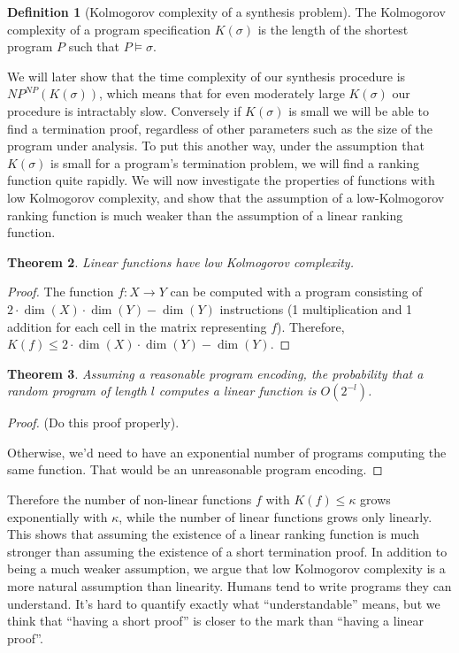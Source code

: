 \documentclass[preprint]{sigplanconf}
\newtheorem{theorem}{Theorem}
\theoremstyle{definition}
\newtheorem{definition}[theorem]{Definition}
\begin{document}
\begin{definition}[Kolmogorov complexity of a synthesis problem]
 The Kolmogorov complexity of a program specification $K(\sigma)$ is the length of the shortest
 program $P$ such that $P \models \sigma$.
\end{definition}

We will later show that the time complexity of our synthesis procedure is $NP^{NP}(K(\sigma))$,
which means that for even moderately large $K(\sigma)$ our procedure is intractably slow.  Conversely
if $K(\sigma)$ is small we will be able to find a termination proof, regardless of other parameters
such as the size of the program under analysis.  To put this another way, under the assumption
that $K(\sigma)$ is small for a program's termination problem, we will find a ranking function
quite rapidly.  We will now investigate the properties of functions with low Kolmogorov complexity,
and show that the assumption of a low-Kolmogorov ranking function is much weaker than the assumption
of a linear ranking function.


\begin{theorem}
 Linear functions have low Kolmogorov complexity.
\end{theorem}

\begin{proof}
 The function $f: X \to Y$ can be computed with a program consisting of
 $2 \cdot \dim(X) \cdot \dim(Y) - \dim(Y)$ instructions (1 multiplication and 1 addition for
 each cell in the matrix representing $f$).  Therefore,
 $K(f) \leq 2 \cdot \dim(X) \cdot \dim(Y) - \dim(Y)$.
\end{proof}

\begin{theorem}
Assuming a reasonable program encoding, the probability that a random program of length $l$ computes
a linear function is $O(2^{-l})$.
\end{theorem}

\begin{proof}
 (Do this proof properly).
 
 Otherwise, we'd need to have an exponential number of programs computing the same function.
 That would be an unreasonable program encoding.
\end{proof}


Therefore the number of non-linear functions $f$ with $K(f) \leq \kappa$
grows exponentially with $\kappa$, while the number of linear functions
grows only linearly.  This shows that assuming the existence of a linear
ranking function is much stronger than assuming the existence of a short
termination proof.  In addition to being a much weaker assumption,
we argue that low Kolmogorov complexity is a more natural assumption than
linearity.  Humans tend to write programs they can understand.  It's hard
to quantify exactly what ``understandable'' means, but we think that
``having a short proof'' is closer to the mark than ``having a linear proof''.
\end{document}
